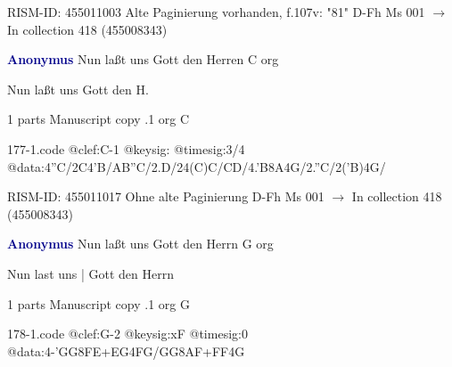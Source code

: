 \documentclass[twocolumn]{book}
\begin{document}
\newline RISM-ID: 455011003
\newline Alte Paginierung vorhanden, f.107v: "81"
\newline D-Fh  Ms 001
\newline $\rightarrow$ In collection 418 (455008343)

\newline \par \vspace{7pt} \textcolor{darkblue}{\textbf{Anonymus  }}
\newline Nun laßt uns Gott den Herren  C  
\newline org
\newline \begin{itshape}[f.114r, heading:] Nun laßt uns Gott den H.\end{itshape} 
\newline \textcolor{darkblue}{}  1 parts  
\newline Manuscript copy
.1  org  C  
\begin{filecontents*}{177-1.code}
@clef:C-1
@keysig:
@timesig:3/4
@data:4''C/2C4'B/AB''C/2.D/24(C)C/CD/4.'B8A4G/2.''C/2('B)4G/
\end{filecontents*}
\newline
%

\newline RISM-ID: 455011017
\newline Ohne alte Paginierung
\newline D-Fh  Ms 001
\newline $\rightarrow$ In collection 418 (455008343)

\newline \par \vspace{7pt} \textcolor{darkblue}{\textbf{Anonymus  }}
\newline Nun laßt uns Gott den Herrn  G  
\newline org
\newline \begin{itshape}[f.13r, at left:] Nun last uns | Gott den Herrn\end{itshape} 
\newline \textcolor{darkblue}{}  1 parts  
\newline Manuscript copy
.1  org  G  
\begin{filecontents*}{178-1.code}
@clef:G-2
@keysig:xF
@timesig:0
@data:4-'GG{8FE+}{EG}4FG/GG{8AF+}{FF}4G
\end{filecontents*}
\newline
%
\end{document}
